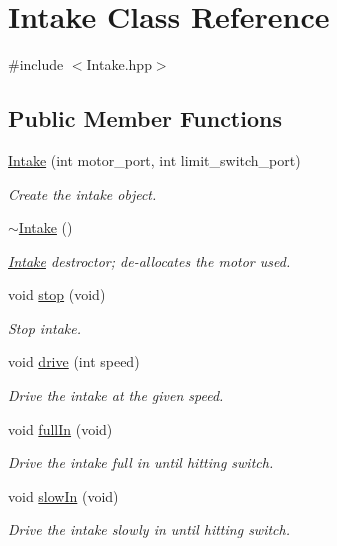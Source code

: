 \hypertarget{class_intake}{}\section{Intake Class Reference}
\label{class_intake}


{\ttfamily \#include $<$Intake.\+hpp$>$}

\subsection*{Public Member Functions}
\begin{DoxyCompactItemize}
\item 
\hyperlink{class_intake_a2e46d55447100225183045b3ba9677a1}{Intake} (int motor\+\_\+port, int limit\+\_\+switch\+\_\+port)
\begin{DoxyCompactList}\small\item\em Create the intake object. \end{DoxyCompactList}\item 
\hyperlink{class_intake_a0bd65acd1cb4ad03c9fc0286f3b57b9b}{$\sim$\+Intake} ()
\begin{DoxyCompactList}\small\item\em \hyperlink{class_intake}{Intake} destroctor; de-\/allocates the motor used. \end{DoxyCompactList}\item 
void \hyperlink{class_intake_a3780c5eb8a67c524cc793aaa631ce62e}{stop} (void)
\begin{DoxyCompactList}\small\item\em Stop intake. \end{DoxyCompactList}\item 
void \hyperlink{class_intake_a582133b5ce9d5bba8d84b6135a16deb7}{drive} (int speed)
\begin{DoxyCompactList}\small\item\em Drive the intake at the given speed. \end{DoxyCompactList}\item 
void \hyperlink{class_intake_a8582bcb135b9700923940a7b44d233ef}{full\+In} (void)
\begin{DoxyCompactList}\small\item\em Drive the intake full in until hitting switch. \end{DoxyCompactList}\item 
void \hyperlink{class_intake_a4c1e0e346839bb294065ae5da7117df0}{slow\+In} (void)
\begin{DoxyCompactList}\small\item\em Drive the intake slowly in until hitting switch. \end{DoxyCompactList}\item 

\end{DoxyCompactItemize}
